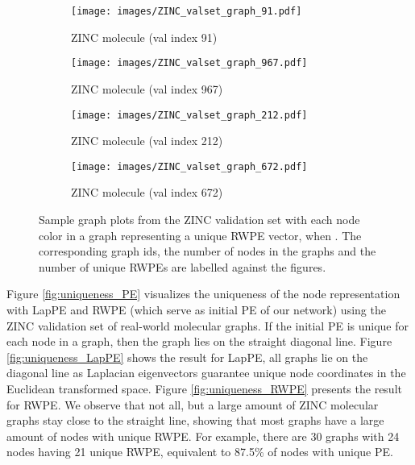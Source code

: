 \documentclass{article} \usepackage{iclr2021_conference,times}
\begin{document}
\begin{figure}[h]
\centering
  \begin{subfigure}{0.4\linewidth}
  \centering
    \texttt{[image: images/ZINC\_valset\_graph\_91.pdf]}
    \vspace{-12pt}
    \caption{ZINC molecule (val index 91)}
    \label{fig:graph_id_91}
  \end{subfigure}
  \hspace{6pt}
  \begin{subfigure}{0.4\linewidth}
  \centering
    \texttt{[image: images/ZINC\_valset\_graph\_967.pdf]}
    \vspace{-12pt}
    \caption{ZINC molecule (val index 967)}
    \label{fig:graph_id_967}
  \end{subfigure}
  \vspace{0.35cm}
  
  \begin{subfigure}{0.4\linewidth}
  \centering
    \texttt{[image: images/ZINC\_valset\_graph\_212.pdf]}
    \vspace{-12pt}
    \caption{ZINC molecule (val index 212)}
    \label{fig:graph_id_212}
  \end{subfigure}
  \hspace{6pt}
  \begin{subfigure}{0.4\linewidth}
  \centering
    \texttt{[image: images/ZINC\_valset\_graph\_672.pdf]}
    \vspace{-12pt}
    \caption{ZINC molecule (val index 672)}
    \label{fig:graph_id_672}
  \end{subfigure}
  \vspace{-5pt}
  \caption{Sample graph plots from the ZINC validation set with each node color in a graph representing a unique RWPE vector, when . The corresponding graph ids, the number of nodes in the graphs and the number of unique RWPEs are labelled against the figures.}
  \label{fig:uniqueness_RWPE_graphs}
\end{figure}




Figure \ref{fig:uniqueness_PE} visualizes the uniqueness of the node representation with LapPE and RWPE (which serve as initial PE of our network) using the ZINC validation set of  real-world molecular graphs. If the initial PE is unique for each node in a graph, then the graph lies on the straight diagonal line. Figure \ref{fig:uniqueness_LapPE} shows the result for LapPE, all graphs lie on the diagonal line as Laplacian eigenvectors guarantee unique node coordinates in the Euclidean transformed space. Figure \ref{fig:uniqueness_RWPE} presents the result for RWPE. We observe that not all, but a large amount of ZINC molecular graphs stay close to the straight line, showing that most graphs have a large amount of nodes with unique RWPE. For example, there are 30 graphs with 24 nodes having 21 unique RWPE, equivalent to 87.5\% of nodes with unique PE.
\end{document}
